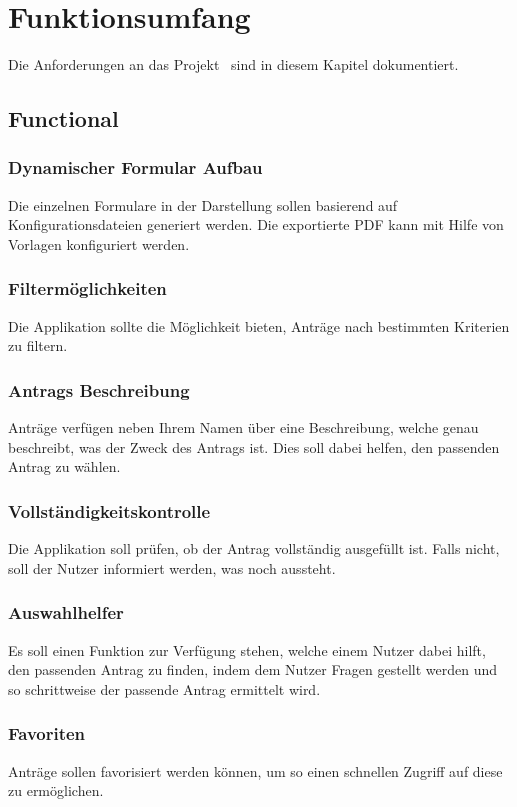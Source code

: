 \chapter{Funktionsumfang}\label{ch:funktionsumfang}

Die Anforderungen an das Projekt \workTitel~sind in diesem Kapitel dokumentiert.

\section{Functional}\label{sec:functional}
\subsection{Dynamischer Formular Aufbau}\label{subsec:dynamischer-formular-aufbau}
Die einzelnen Formulare in der Darstellung sollen basierend auf Konfigurationsdateien generiert werden.
Die exportierte \ac{PDF} kann mit Hilfe von Vorlagen konfiguriert werden.
\subsection{Filtermöglichkeiten}\label{subsec:filtermoglichkeiten}
Die Applikation sollte die Möglichkeit bieten, Anträge nach bestimmten Kriterien zu filtern.
\subsection{Antrags Beschreibung}\label{subsec:antrags-beschreibung}
Anträge verfügen neben Ihrem Namen über eine Beschreibung, welche genau beschreibt, was der Zweck des Antrags ist.
Dies soll dabei helfen, den passenden Antrag zu wählen.
\subsection{Vollständigkeitskontrolle}\label{subsec:vollstandigkeitskontrolle}
Die Applikation soll prüfen, ob der Antrag vollständig ausgefüllt ist.
Falls nicht, soll der Nutzer informiert werden, was noch aussteht.
\subsection{Auswahlhelfer}\label{subsec:auswahls-helfer}
Es soll einen Funktion zur Verfügung stehen, welche einem Nutzer dabei hilft,
den passenden Antrag zu finden, indem dem Nutzer Fragen gestellt werden und so schrittweise der passende Antrag ermittelt wird.
\subsection{Favoriten}\label{subsec:favoriten}
Anträge sollen favorisiert werden können, um so einen schnellen Zugriff auf diese zu ermöglichen.
